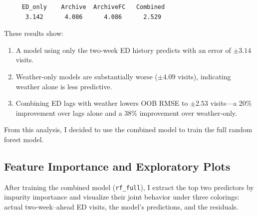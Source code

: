 \documentclass[11pt]{article}
\begin{document}
\begin{verbatim}
     ED_only    Archive  ArchiveFC   Combined 
      3.142      4.086      4.086      2.529
\end{verbatim}

\noindent These results show:

\begin{enumerate}[nosep]
  \item A model using only the two-week ED history predicts with an error of \(\pm3.14\) visits.
  \item Weather‐only models are substantially worse (\(\pm4.09\) visits), indicating weather alone is less predictive.
  \item Combining ED lags with weather lowers OOB RMSE to \(\pm2.53\) visits—a 20\% improvement over lags alone and a 38\% improvement over weather‐only.
\end{enumerate}

From this analysis, I decided to use the combined model to train the full random forest model.

\subsection{Feature Importance and Exploratory Plots}

After training the combined model (\texttt{rf\_full}), I extract the top two predictors by impurity importance and visualize their joint behavior under three colorings: actual two‐week–ahead ED visits, the model’s predictions, and the residuals.
\end{document}
